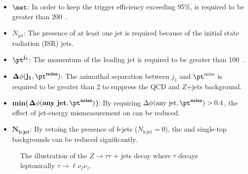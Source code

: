 \begin{itemize}
    \item $\mathbf{\met}$: In order to keep the \met trigger efficiency exceeding 95\%, \met is required to be greater than 200~{\GeV}.

    \item $N_{\mathrm{jet}}$: The presence of at least one jet is required because of the initial state radiation (ISR) jets.

    \item $\mathbf{\pt^{j_{1}}}$: The momentum of the leading jet is required to be greater than 100~{\GeV}.

    \item $\mathbf{\Delta \phi(j_{1}, \pt^{\textbf{miss}})}$: The azimuthal separation between $j_{1}$ and $\mathbf{\pt^{\textrm{miss}}}$ is required to be greater than 2 to suppress the QCD and $Z$+jets background.

    \item \textbf{min($\mathbf{\Delta \phi(\textbf{any jet}, \pt^{\textbf{miss}})}$)}: By requiring $\Delta \phi(\textrm{any jet}, \pt^{\textbf{miss}}) > 0.4$, the effect of jet-energy mismeasurement on \met can be reduced.

    \item $\mathbf{N}_{\mathbf{b}\textbf{-jet}}$: By vetoing the presence of $b$-jets ($N_{b\textrm{-jet}} = 0$), the \ttbar and single-top backgrounds can be reduced significantly.
\end{itemize}

\begin{figure}[htb]
    \begin{center}
        
        \caption{The illustration of the $Z \to \tau\tau$ + jets decay where $\tau$ decays leptonically $\tau \to \ell \nu_{\ell} \nu_{\tau}$.}
        \label{fig:event_mtautau}
    \end{center}
\end{figure}

